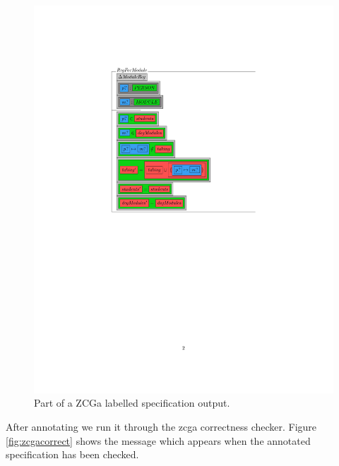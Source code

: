 \begin{figure}[H]
\begin{minipage}{0.45\textwidth}
\includegraphics[scale=0.7, clip, trim=5.5cm 13cm 8.5cm 4cm, width=1.00\textwidth]{Figures/fullexample/2.jpg}
\vspace{-0.3in}
\caption{Part of a ZCGa labelled specification output. \label{fig:zcgaschemaout}}
\end{minipage}
\end{figure}

After annotating we run it through the \gls{zcga} correctness checker. Figure
\ref{fig:zcgacorrect} shows the message which appears when the annotated
specification has been checked. 

